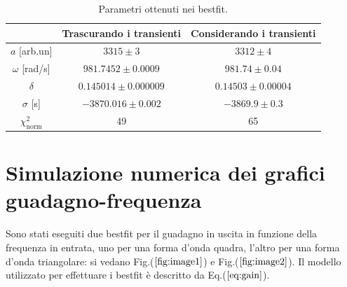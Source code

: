 \documentclass{article}
\begin{document}
            \begin{table}[H]
                \centering
                \begin{tabular}{ccc}
                    \hline
                               & Trascurando i transienti              &Considerando i transienti\\
                    \hline
                    $a$ [arb.un]          & $3315 \pm 3$                          & $3312\pm 4$    \\
                    $\omega$ [rad/s]    & $981.7452\pm 0.0009$                  & $981.74\pm 0.04$ \\
                    $\delta$            & $0.145014\pm 0.000009$                & $0.14503\pm 0.00004$   \\
                    $\sigma$ [s]        & $-3870.016 \pm 0.002$                 & $-3869.9 \pm 0.3$  \\
                    $\chi^{2}_{\text{norm}}$   & 49                                    & 65 \\
                    \hline
                \end{tabular}
                \caption{Parametri ottenuti nei bestfit.}
                \label{tab:bestfit_train}
            \end{table}
\section{Simulazione numerica dei grafici guadagno-frequenza}
    Sono stati eseguiti due bestfit per il guadagno in uscita
     in funzione della frequenza in entrata, uno per una forma d'onda 
     quadra, l'altro per una forma d'onda triangolare: si vedano 
     Fig.($\ref{fig:image1}$) e Fig.($\ref{fig:image2}$). 
      Il modello utilizzato per effettuare i bestfit è descritto da Eq.($\ref{eq:gain}$). 
      
\end{document}

